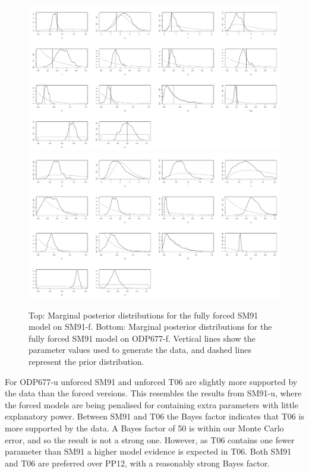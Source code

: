 \documentclass[a4paper,12pt]{article}
\begin{document}
\begin{figure}[p]
\centering
\includegraphics[width=\textwidth]{MSSSPE.pdf}\\\vspace{24pt}
\includegraphics[width=\textwidth]{LR04677SM91.pdf}
\caption{Top: Marginal posterior distributions for the fully forced SM91 model on SM91-f.
Bottom: Marginal posterior distributions for the fully forced SM91 model on ODP677-f.
Vertical lines show the parameter values used to generate the data, and dashed lines represent the prior distribution.}
\label{Fig:Posterior}
\end{figure}

For ODP677-u unforced SM91 and unforced T06 are slightly more supported by the data than the forced versions.
This resembles the results from SM91-u, where the forced models are being penalised for containing extra parameters with little explanatory power.
Between SM91 and T06 the Bayes factor indicates that T06 is more supported by the data.
A Bayes factor of 50 is within our Monte Carlo error, and so the result is not a strong one.
However, as T06 contains one fewer parameter than SM91 a higher model evidence is expected in T06.
Both SM91 and T06 are preferred over PP12, with a reasonably strong Bayes factor.
\end{document}
